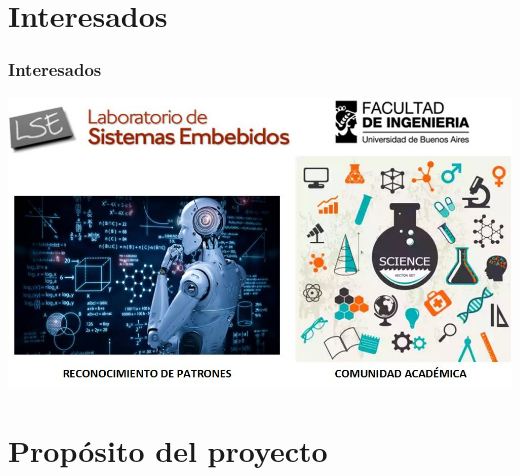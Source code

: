\documentclass{beamer}
\begin{document}
\section{Interesados}

\begin{frame}[allowframebreaks,c]

\frametitle{Interesados}

\centering

\includegraphics[scale=0.45]{Figuras/INT}

\end{frame}

\section{Propósito del proyecto}
\end{document}
